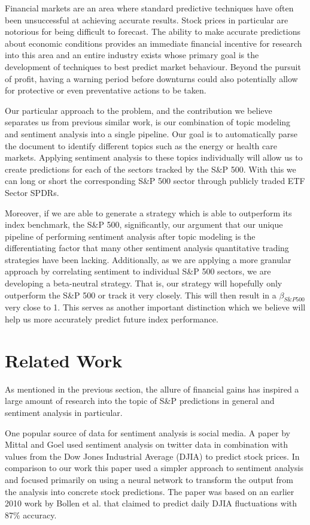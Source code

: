 \documentclass{sig-alternate-05-2015}
\begin{document}
Financial markets are an area where standard
predictive techniques have often been unsuccessful at achieving
accurate results. Stock prices in particular are notorious
for being difficult to forecast. The ability to make accurate 
predictions about economic conditions provides an immediate 
financial incentive for research into this area and an entire 
industry exists whose primary goal is the development of 
techniques to best predict market behaviour. Beyond the pursuit of
profit, having a warning period before downturns could 
also potentially allow for protective or even preventative 
actions to be taken. 

Our particular approach to the problem, and the contribution we 
believe separates us from previous similar work, is our combination
of topic modeling and sentiment analysis into a single pipeline. Our
goal is to automatically parse the document to identify different
topics such as the energy or health care markets. Applying
sentiment analysis to these topics individually will allow us to create
predictions for each of the sectors tracked by the S\&P 500. With this we can long or short the corresponding S\&P 500 sector through publicly traded ETF Sector SPDRs.

Moreover, if we are able to generate a strategy which is able to outperform its index benchmark, the S\&P 500, significantly, our argument that our unique pipeline of performing sentiment analysis after topic modeling is the differentiating factor that many other sentiment analysis quantitative trading strategies have been lacking. Additionally, as we are applying a more granular approach by correlating sentiment to individual S\&P 500 sectors, we are developing a beta-neutral strategy. That is, our strategy will hopefully only outperform the S\&P 500 or track it very closely. This will then result in a $\beta_{S\&P 500}$ very close to 1. This serves as another important distinction which we believe will help us more accurately predict future index performance. 

\section{Related Work}
As mentioned in the previous section, the allure of financial gains
has inspired a large amount of research into the topic of S\&P predictions
in general and sentiment analysis in particular. 

One popular source of data for sentiment analysis is social media. A paper
by Mittal and Goel\cite{mittal:sp} used sentiment analysis on twitter data in combination
with values from the Dow Jones Industrial Average (DJIA) to predict stock prices.
In comparison to our work this paper used a simpler approach to sentiment
analysis and focused primarily on using a neural network to transform the
output from the analysis into concrete stock predictions. The paper was based
on an earlier 2010 work by Bollen et al. that claimed to predict daily DJIA 
fluctuations with 87\% accuracy.\cite{bollen:twitter}
\end{document}
